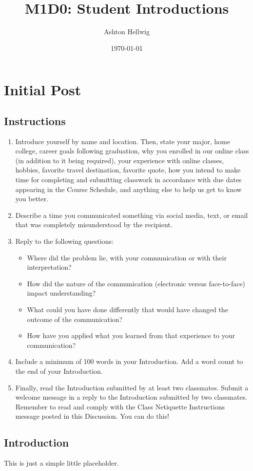 \documentclass[stu,12pt]{apa7}
\title{%
    M1D0: Student Introductions
  }
\author{Ashton Hellwig}
\date{\today}
\begin{document}
  \maketitle

  \section{Initial Post}
    \subsection*{Instructions}
      \begin{enumerate}
        \item Introduce yourself by name and location. Then, state your major,
          home college, career goals following graduation, why you enrolled in
          our online class (in addition to it being required), your experience
          with online classes, hobbies, favorite travel destination, favorite
          quote, how you intend to make time for completing and submitting
          classwork in accordance with due dates appearing in the Course
          Schedule, and anything else to help us get to know you better.
        \item Describe a time you communicated something via social media, text,
          or email that was completely misunderstood by the recipient.
        \item Reply to the following questions:
          \begin{itemize}
            \item Where did the problem lie, with your communication or with
              their interpretation?
            \item How did the nature of the communication (electronic versus
              face-to-face) impact understanding?
            \item What could you have done differently that would have changed
              the outcome of the communication?
            \item How have you applied what you learned from that experience to
              your communication?
          \end{itemize}
        \item Include a minimum of 100 words in your Introduction. Add a word
          count to the end of your Introduction.
        \item Finally, read the Introduction submitted by at least two
          classmates. Submit a welcome message in a reply to the Introduction
          submitted by two classmates. Remember to read and comply with the
          Class Netiquette Instructions message posted in this Discussion. You
          can do this!
      \end{enumerate}

    \newpage
    \subsection{Introduction}
      This is just a simple little placeholder.


\end{document}
